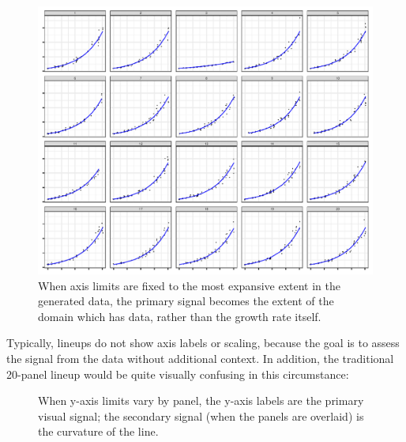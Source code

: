\documentclass[12pt]{article}
\begin{document}
\begin{figure}[tbp]

{\centering \includegraphics[width=.6\linewidth,]{appendix_files/figure-latex/lineup-fixed-scales-1} 

}

\caption{When axis limits are fixed to the most expansive extent in the generated data, the primary signal becomes the extent of the domain which has data, rather than the growth rate itself.}\label{fig:lineup-fixed-scales}
\end{figure}

Typically, lineups do not show axis labels or scaling, because the goal
is to assess the signal from the data without additional context. In
addition, the traditional 20-panel lineup would be quite visually
confusing in this circumstance:

\begin{figure}[tbp]

{\centering {}

}

\caption{When y-axis limits vary by panel, the y-axis labels are the primary visual signal; the secondary signal (when the panels are overlaid) is the curvature of the line.}\label{fig:lineup-free-scales}
\end{figure}
\end{document}
